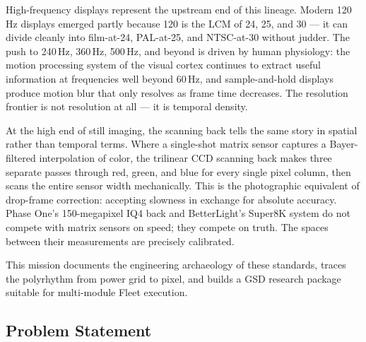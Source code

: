 \documentclass[11pt,letterpaper]{article}
\begin{document}
High-frequency displays represent the upstream end of this lineage. Modern 120\,Hz displays emerged
partly because 120 is the LCM of 24, 25, and 30 --- it can divide cleanly into film-at-24, PAL-at-25,
and NTSC-at-30 without judder. The push to 240\,Hz, 360\,Hz, 500\,Hz, and beyond is driven by human
physiology: the motion processing system of the visual cortex continues to extract useful information
at frequencies well beyond 60\,Hz, and sample-and-hold displays produce motion blur that only resolves
as frame time decreases. The resolution frontier is not resolution at all --- it is temporal density.

At the high end of still imaging, the scanning back tells the same story in spatial rather than
temporal terms. Where a single-shot matrix sensor captures a Bayer-filtered interpolation of color,
the trilinear CCD scanning back makes three separate passes through red, green, and blue for every
single pixel column, then scans the entire sensor width mechanically. This is the photographic
equivalent of drop-frame correction: accepting slowness in exchange for absolute accuracy. Phase One's
150-megapixel IQ4 back and BetterLight's Super8K system do not compete with matrix sensors on speed;
they compete on truth. The spaces between their measurements are precisely calibrated.

This mission documents the engineering archaeology of these standards, traces the polyrhythm from
power grid to pixel, and builds a GSD research package suitable for multi-module Fleet execution.

\subsection{Problem Statement}
\end{document}
